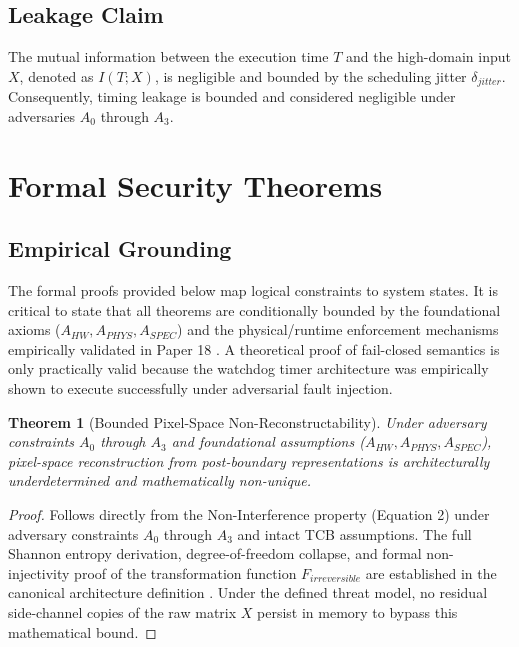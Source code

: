 \documentclass[conference]{IEEEtran}
\newtheorem{theorem}{Theorem}
\begin{document}
\subsection{Leakage Claim}
The mutual information between the execution time $T$ and the high-domain input $X$, denoted as $I(T; X)$, is negligible and bounded by the scheduling jitter $\delta_{jitter}$. Consequently, timing leakage is bounded and considered negligible under adversaries $A_0$ through $A_3$.

\section{Formal Security Theorems}

\subsection{Empirical Grounding}
The formal proofs provided below map logical constraints to system states. It is critical to state that all theorems are conditionally bounded by the foundational axioms ($A_{HW}, A_{PHYS}, A_{SPEC}$) and the physical/runtime enforcement mechanisms empirically validated in Paper 18 \cite{P18}. A theoretical proof of fail-closed semantics is only practically valid because the watchdog timer architecture was empirically shown to execute successfully under adversarial fault injection.

\begin{theorem}[Bounded Pixel-Space Non-Reconstructability]
Under adversary constraints $A_0$ through $A_3$ and foundational assumptions ($A_{HW}, A_{PHYS}, A_{SPEC}$), pixel-space reconstruction from post-boundary representations is architecturally underdetermined and mathematically non-unique.
\end{theorem}
\begin{proof}
Follows directly from the Non-Interference property (Equation 2) under adversary constraints $A_0$ through $A_3$ and intact TCB assumptions. The full Shannon entropy derivation, degree-of-freedom collapse, and formal non-injectivity proof of the transformation function $F_{irreversible}$ are established in the canonical architecture definition \cite{P17}. Under the defined threat model, no residual side-channel copies of the raw matrix $X$ persist in memory to bypass this mathematical bound.
\end{proof}
\end{document}
